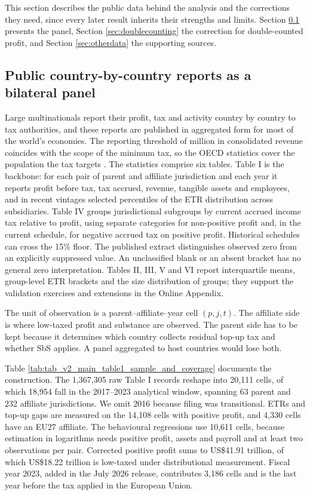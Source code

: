 \documentclass[11pt,a4paper]{article}
\newcommand{\EUR}{\texteuro}
\newcommand{\usd}{US\$}
\begin{document}
This section describes the public data behind the analysis and the corrections they need, since every later result inherits their strengths and limits. Section \ref{sec:cbcr} presents the panel, Section \ref{sec:doublecounting} the correction for double-counted profit, and Section \ref{sec:otherdata} the supporting sources.

\subsection{Public country-by-country reports as a bilateral panel}\label{sec:cbcr}

Large multinationals report their profit, tax and activity country by country to tax authorities, and these reports are published in aggregated form for most of the world's economies. The reporting threshold of \EUR750 million in consolidated revenue coincides with the scope of the minimum tax, so the OECD statistics cover the population the tax targets \citep{oecd2026cbcr}. The statistics comprise six tables. Table I is the backbone: for each pair of parent and affiliate jurisdiction and each year it reports profit before tax, tax accrued, revenue, tangible assets and employees, and in recent vintages selected percentiles of the ETR distribution across subsidiaries. Table IV groups jurisdictional subgroups by current accrued income tax relative to profit, using separate categories for non-positive profit and, in the current schedule, for negative accrued tax on positive profit. Historical schedules can cross the 15\% floor. The published extract distinguishes observed zero from an explicitly suppressed value. An unclassified blank or an absent bracket has no general zero interpretation. Tables II, III, V and VI report interquartile means, group-level ETR brackets and the size distribution of groups; they support the validation exercises and extensions in the Online Appendix.

The unit of observation is a parent–affiliate–year cell $(p,j,t)$. The affiliate side is where low-taxed profit and substance are observed. The parent side has to be kept because it determines which country collects residual top-up tax and whether SbS applies. A panel aggregated to host countries would lose both.

Table \ref{tab:tab_v2_main_table1_sample_and_coverage} documents the construction. The 1,367,305 raw Table I records reshape into 20,111 cells, of which 18,954 fall in the 2017–2023 analytical window, spanning 63 parent and 232 affiliate jurisdictions. We omit 2016 because filing was transitional. ETRs and top-up gaps are measured on the 14,108 cells with positive profit, and 4,330 cells have an EU27 affiliate. The behavioural regressions use 10,611 cells, because estimation in logarithms needs positive profit, assets and payroll and at least two observations per pair. Corrected positive profit sums to \usd41.91 trillion, of which \usd18.22 trillion is low-taxed under distributional measurement. Fiscal year 2023, added in the July 2026 release, contributes 3,186 cells and is the last year before the tax applied in the European Union.
\end{document}

